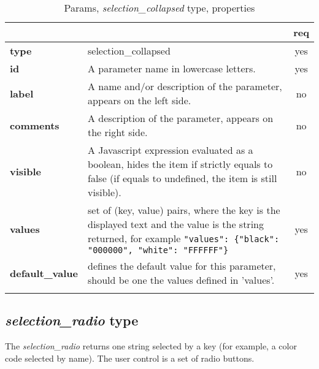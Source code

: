 \begin{longtable}{|>{\bf}L{\linewidth}|L{\linewidth}|c|}
\hline
      &  & {\bf req} 
\tabularnewline \hline \hline
 type  & selection\_collapsed    & yes \\ \hline
 id     & A parameter name in lowercase letters. & yes \\ \hline
 label  & A name and/or description of the parameter, appears on the left side. & no
                      \\ \hline
 comments & A description of the parameter, appears on the right side. & no
                      \\ \hline
 visible    & A Javascript expression evaluated as a boolean, hides the item if
              strictly equals to false (if equals to undefined, the item is still visible). 
            & no \\ \hline
 values & set of (key, value) pairs, where the key is the displayed text and the 
value is the string returned, for example \texttt{"values": \{"black": "000000", "white": "FFFFFF"\}} & yes
                      \\ \hline
 default\_value & defines the default value for this parameter, should be one 
the values defined in 'values'. & yes \\ \hline
\caption{Params, \emph{selection\_collapsed} type, properties}
\end{longtable}

\subsection{ \emph{selection\_radio} type}

The \emph{selection\_radio} returns one string selected by a key (for example, 
a color code selected by name). The user control is a set of radio buttons.

